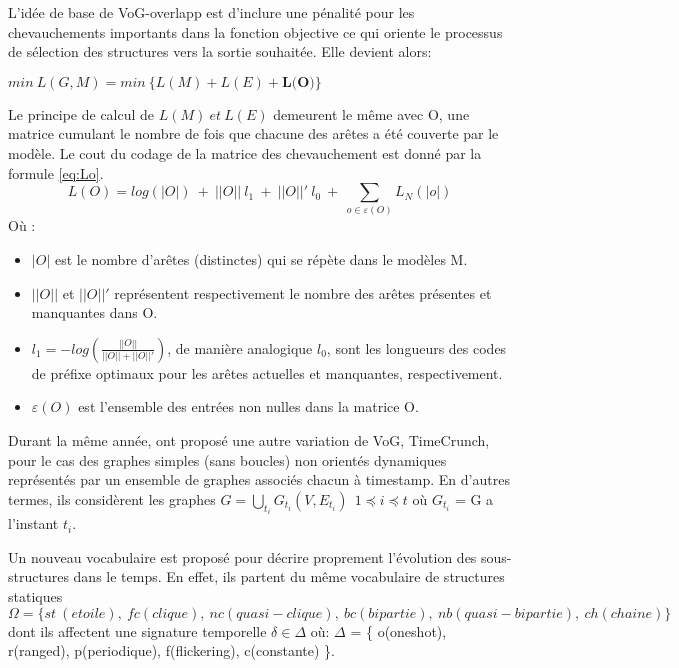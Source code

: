 \documentclass[11pt,a4paper]{report}
\theoremstyle{definition}
\begin{document}
			
			
			L'idée de base de VoG-overlapp est d'inclure une pénalité pour les chevauchements importants dans la fonction objective ce qui oriente le processus de sélection des structures vers la sortie souhaitée. Elle devient alors:
			\begin{center}
				$min\ L(G,M) = min\ \big\{L(M) + L(E) +\textbf{L(O)}\big\}$
			\end{center}
			
			Le principe de calcul de $L(M)\ et\ L(E)$ demeurent le même avec O, une matrice cumulant le nombre de fois que chacune des arêtes a été couverte par le modèle. Le cout du codage de la matrice des chevauchement est donné par la formule \eqref{eq:Lo}.
			\begin{equation} \label{eq:Lo}
				L(O) = log(|O|)\ +\ ||O||\ l_{1}\ +\ ||O||'\ l_{0}\ +\  \displaystyle{\sum_{o\in\varepsilon(O)}L_{N}(|o|)}
			\end{equation}
			Où :
			\begin{itemize}[label=$\circ$]
				\item $|O|$  est le nombre d'arêtes (distinctes) qui se répète dans le modèles M. 
				\item $||O||$ et $||O||'$ représentent respectivement le nombre des arêtes présentes et manquantes dans O.
				\item $l_{1} = -log (\frac{||O||}{||O||+||O||'})$, de manière analogique $l_{0}$, sont les longueurs des codes de préfixe optimaux pour les arêtes actuelles et manquantes, respectivement.
				\item $\varepsilon(O)$  est l'ensemble des entrées non nulles dans la matrice O.\\
			\end{itemize}
			
			
			
			Durant la même année, \citep{shah2015timecrunch} ont proposé une autre variation de VoG, TimeCrunch, pour le cas des graphes simples (sans boucles) non orientés dynamiques représentés par un ensemble de graphes associés chacun à timestamp. En d'autres termes, ils considèrent les graphes $\displaystyle{G=\bigcup_{t_{i}}G_{t_{i}}(V,E_{t_{i}})}\ \ 1 \preceq i \preceq t$ où $G_{t_{i}}$ = G a l'instant $t_{i}$.
			
			
			Un nouveau vocabulaire est proposé pour décrire proprement l'évolution des sous-structures dans le temps. En effet, ils partent du même vocabulaire de structures statiques 
			$\Omega =\{ st\ (etoile),\ fc (clique),\ nc (quasi-clique),\ bc (bipartie),\ nb (quasi-bipartie),\ ch (chaine)\}$ 
			dont ils affectent une signature temporelle $\delta \in \Delta$ où: $\Delta$ = \{ o(oneshot), r(ranged), p(periodique), f(flickering), c(constante) \}. 
			
\end{document}

